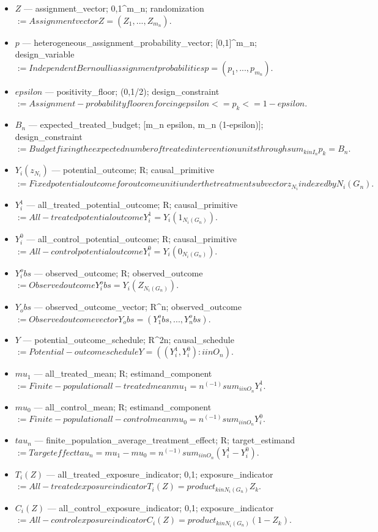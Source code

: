 \documentclass{article}
\begin{document}
\begin{itemize}
  \item $Z$ --- assignment_vector; {0,1}^{m_n}; randomization $:= Assignment vector Z = (Z_1,...,Z_{m_n}).$
  \item $p$ --- heterogeneous_assignment_probability_vector; [0,1]^{m_n}; design_variable $:= Independent Bernoulli assignment probabilities p = (p_1,...,p_{m_n}).$
  \item $epsilon$ --- positivity_floor; (0,1/2); design_constraint $:= Assignment-probability floor enforcing epsilon <= p_k <= 1-epsilon.$
  \item $B_n$ --- expected_treated_budget; [m_n epsilon, m_n (1-epsilon)]; design_constraint $:= Budget fixing the expected number of treated intervention units through sum_{k in I_n} p_k = B_n.$
  \item $Y_i(z_{N_i})$ --- potential_outcome; R; causal_primitive $:= Fixed potential outcome for outcome unit i under the treatment subvector z_{N_i} indexed by N_i(G_n).$
  \item $Y_i^1$ --- all_treated_potential_outcome; R; causal_primitive $:= All-treated potential outcome Y_i^1 = Y_i(1_{N_i(G_n)}).$
  \item $Y_i^0$ --- all_control_potential_outcome; R; causal_primitive $:= All-control potential outcome Y_i^0 = Y_i(0_{N_i(G_n)}).$
  \item $Y_i^obs$ --- observed_outcome; R; observed_outcome $:= Observed outcome Y_i^obs = Y_i(Z_{N_i(G_n)}).$
  \item $Y_obs$ --- observed_outcome_vector; R^n; observed_outcome $:= Observed outcome vector Y_obs = (Y_1^obs,...,Y_n^obs).$
  \item $Y$ --- potential_outcome_schedule; R^{2n}; causal_schedule $:= Potential-outcome schedule Y = ((Y_i^1,Y_i^0) : i in O_n).$
  \item $mu_1$ --- all_treated_mean; R; estimand_component $:= Finite-population all-treated mean mu_1 = n^(-1) sum_{i in O_n} Y_i^1.$
  \item $mu_0$ --- all_control_mean; R; estimand_component $:= Finite-population all-control mean mu_0 = n^(-1) sum_{i in O_n} Y_i^0.$
  \item $tau_n$ --- finite_population_average_treatment_effect; R; target_estimand $:= Target effect tau_n = mu_1 - mu_0 = n^(-1) sum_{i in O_n} (Y_i^1 - Y_i^0).$
  \item $T_i(Z)$ --- all_treated_exposure_indicator; {0,1}; exposure_indicator $:= All-treated exposure indicator T_i(Z) = product_{k in N_i(G_n)} Z_k.$
  \item $C_i(Z)$ --- all_control_exposure_indicator; {0,1}; exposure_indicator $:= All-control exposure indicator C_i(Z) = product_{k in N_i(G_n)} (1-Z_k).$

\end{itemize}
\end{document}
